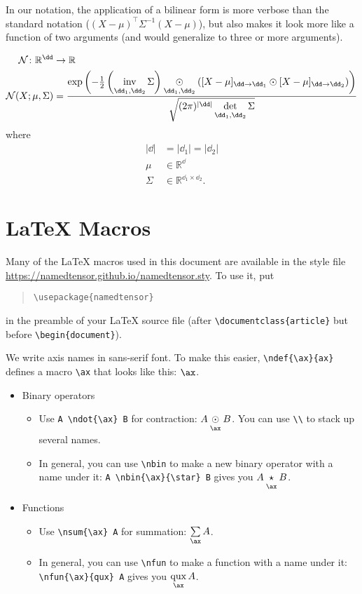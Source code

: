 \documentclass{article}
\newcommand{\reals}{\mathbb{R}}
\begin{document}
In our notation, the application of a bilinear form is more verbose than the standard notation ($(X-\mu)^\top \Sigma^{-1} (X-\mu)$), but also makes it look more like a function of two arguments (and would generalize to three or more arguments).

\begin{align*}
\mathcal{N} \colon \reals^{\dd} &\rightarrow \reals \\
\mathcal{N}(X; \mu, \Sigma) &= \frac{\exp\left(-\frac{1}{2} \left(\nfun{\dd_1, \dd_2}{inv} \Sigma\right) \ndot{\dd_1,\dd_2} \left([X - \mu]_{\dd\rightarrow\dd_1} \odot [X - \mu]_{\dd\rightarrow\dd_2} \right) \right)}{\sqrt{(2 \pi)^{|\dd|} \nfun{\dd_1, \dd_2}{det} \Sigma}}
\end{align*}
where
\begin{align*}
|\dd| &= |\dd_1| = |\dd_2| \\
\mu &\in \reals^{\dd} \\
\Sigma & \in \reals^{\dd_1 \times \dd_2}.
\end{align*}

\section{\LaTeX{} Macros}

Many of the \LaTeX{} macros used in this document are available in the style file \url{https://namedtensor.github.io/namedtensor.sty}. To use it, put
\begin{quote}
\begin{verbatim}
\usepackage{namedtensor}
\end{verbatim}
\end{quote}
in the preamble of your \LaTeX{} source file (after \verb|\documentclass{article}| but before \verb|\begin{document}|).

We write axis names in sans-serif font. To make this easier, \verb|\ndef{\ax}{ax}| defines a macro \verb|\ax| that looks like this: $\ax$.

\begin{itemize}
\item Binary operators
  \begin{itemize}
  \item Use \verb|A \ndot{\ax} B| for contraction: $A \ndot{\ax} B$. You can use \verb|\\| to stack up several names.
  \item In general, you can use \verb|\nbin| to make a new binary operator with a name under it: \verb|A \nbin{\ax}{\star} B| gives you $A \nbin{\ax}{\star} B$.
  \end{itemize}
\item Functions
  \begin{itemize}
  \item Use \verb|\nsum{\ax} A| for summation: $\nsum{\ax} A$.
  \item In general, you can use \verb|\nfun| to make a function with a name under it: \verb|\nfun{\ax}{qux} A| gives you $\nfun{\ax}{qux} A$.
  \end{itemize}
\end{itemize}
\end{document}
